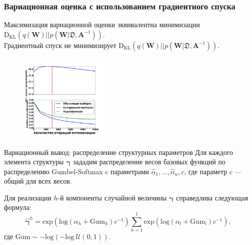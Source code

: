 \documentclass[usenames,dvipsnames,11pt,pdf,utf8,russian,aspectratio=169]{beamer}
\begin{document}
\begin{frame}
\frametitle{Вариационная оценка с использованием градиентного спуска}
\footnotesize
Максимизация вариационной оценки эквивалентна минимизации $\text{D}_{\text{KL}}(q(\mathbf{W})||p(\mathbf{W} | \mathfrak{D},\mathbf{A}^{-1}))$.\\
Градиентный спуск не минимизирует $\text{D}_{\text{KL}}(q(\mathbf{W})||p(\mathbf{W} | \mathfrak{D},\mathbf{A}^{-1}))$.
\begin{multicols}{2}

\begin{figure}
\end{figure}

\columnbreak


\begin{figure}
{\includegraphics[width=0.38\textwidth]{./slide_plots/sgd_show.pdf}}
\end{figure}
\end{multicols}
\end{frame}


\begin{frame}{Вариационный вывод: распределение структурных параметров}
Для каждого элемента структуры $\boldsymbol{\gamma}$ зададим распределение весов базовых функций по распределению Gumbel-Softmax c параметрами $\hat{\alpha}_1, \dots, \hat{\alpha}_u, c$, где параметр $c$ --- общий для всех весов.

Для реализации $h$-й компоненты случайной величины $\boldsymbol{\gamma}$ справедлива следующая формула:
\[
    \hat{\boldsymbol{\gamma}}^h = \text{exp}\left(\text{log}\left(\alpha_h + \text{Gum}_h\right)c^{-1}\right) \sum_{h=1}^l \text{exp}\left(\text{log}\left(\alpha_l + \text{Gum}_l\right)c^{-1}\right),
\]
где $\text{Gum} \sim -\text{log}(-\text{log}~\mathcal{U}(0,1)).$ 
\end{frame}
\end{document}
